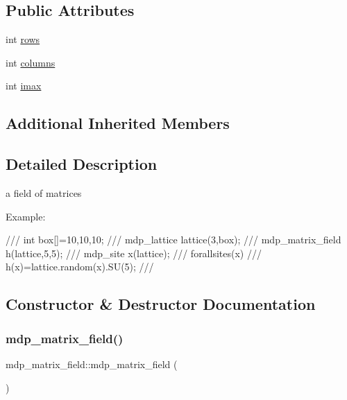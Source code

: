 \subsection*{Public Attributes}
\begin{DoxyCompactItemize}
\item 
int \hyperlink{classmdp__matrix__field_ac19f5807ad30e73c0362753a6b04c491}{rows}
\item 
int \hyperlink{classmdp__matrix__field_aed230e738036a9f78c46089fe3710a53}{columns}
\item 
int \hyperlink{classmdp__matrix__field_a36e86a01ec41e2c0c67194091119c835}{imax}
\end{DoxyCompactItemize}
\subsection*{Additional Inherited Members}


\subsection{Detailed Description}
a field of matrices 

Example\+: \begin{DoxyVerb}///    int box[]={10,10,10};
///    mdp_lattice lattice(3,box);
///    mdp_matrix_field h(lattice,5,5);
///    mdp_site x(lattice);
///    forallsites(x)
///       h(x)=lattice.random(x).SU(5);
/// \end{DoxyVerb}
 

\subsection{Constructor \& Destructor Documentation}
\mbox{\label{classmdp__matrix__field_adebb4692eba7a0f92450e227a1b28ca3}} 
\subsubsection{\texorpdfstring{mdp\+\_\+matrix\+\_\+field()}{mdp\_matrix\_field()}\hspace{0.1cm}{\footnotesize\ttfamily [1/3]}}
{\footnotesize\ttfamily mdp\+\_\+matrix\+\_\+field\+::mdp\+\_\+matrix\+\_\+field (\begin{DoxyParamCaption}{ }\end{DoxyParamCaption})\hspace{0.3cm}{\ttfamily [inline]}}

